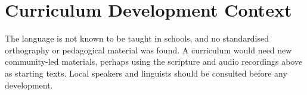 \documentclass[12pt]{article}
\begin{document}
\section{Curriculum Development Context}
The language is not known to be taught in schools, and no standardised orthography or pedagogical material was found. A curriculum would need new community-led materials, perhaps using the scripture and audio recordings above as starting texts. Local speakers and linguists should be consulted before any development.
\end{document}
